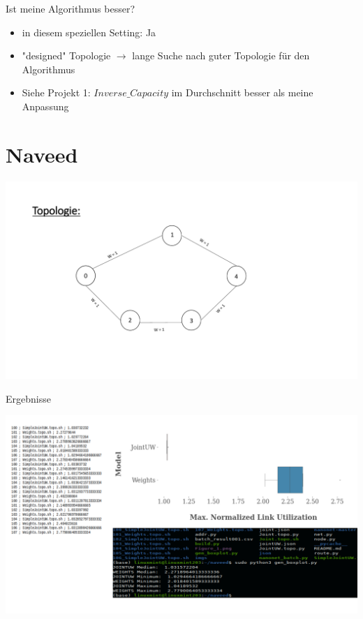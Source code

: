 \documentclass[aspectratio=169,10pt]{beamer}
\begin{document}
\begin{frame}{Ist meine Algorithmus besser?}
\Large
\begin{itemize}
    \item in diesem speziellen Setting: Ja
    \item "designed" Topologie\newline
    $\rightarrow$ lange Suche nach guter Topologie f\"ur den Algorithmus
    \item Siehe Projekt 1: $Inverse\_Capacity$ im Durchschnitt besser als meine Anpassung
\end{itemize}
\end{frame}
\section{Naveed}
\begin{frame}[fragile]{}
\begin{center}
    \includegraphics[width=\textwidth]{images/naveed_1.pdf}
\end{center}
\end{frame}
\begin{frame}{Ergebnisse}
\begin{center}
    \includegraphics[width=\textwidth]{images/naveed_2.pdf}
\end{center}
\end{frame}
\end{document}
